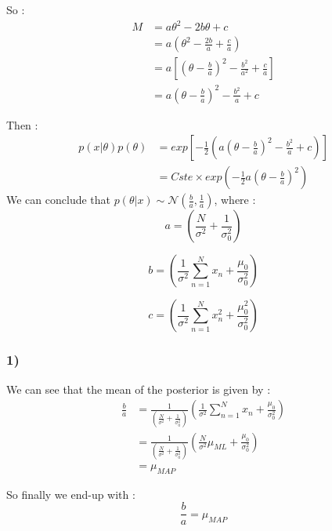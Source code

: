 \documentclass[12pt,twoside]{article}
\begin{document}
So :
\begin{align*}
M &= a \theta^2 - 2b \theta + c \\
  &= a \left(\theta^2 - \frac{2b}{a} + \frac{c}{a}\right) \\
  &= a \left[\left( \theta - \frac{b}{a} \right)^2 - \frac{b^2}{a^2} + \frac{c}{a}\right] \\
  &= a \left( \theta - \frac{b}{a} \right)^2 - \frac{b^2}{a} + c
\end{align*}

Then :
\begin{align*}
p(x|\theta)p(\theta) &= exp \left[-\frac{1}{2}\left(a ( \theta - \frac{b}{a} )^2 - \frac{b^2}{a} + c\right)\right] \\
                     &= Cste \times exp \left(-\frac{1}{2}a( \theta - \frac{b}{a} )^2\right)
\end{align*}
We  can conclude that $p(\theta|x) \sim \mathcal{N}(\frac{b}{a}, \frac{1}{a})$, where :
\begin{equation*}
a = \left(\frac{N}{\sigma^2} + \frac{1}{\sigma_0^2}\right)
\end{equation*}

\begin{equation*}
b = \left(\frac{1}{\sigma^2}\sum_{n=1}^{N}x_n + \frac{\mu_0}{\sigma_0^2} \right)
\end{equation*}

\begin{equation*}
c = \left(\frac{1}{\sigma^2} \sum_{n=1}^{N}x_n^2 + \frac{\mu_0^2}{\sigma_0^2} \right)
\end{equation*}

\subsubsection*{1)} We can see that the mean of the posterior is given by :
\begin{align*}
\frac{b}{a} &= \frac{1}{\left(\frac{N}{\sigma^2} + \frac{1}{\sigma_0^2}\right)} \left(\frac{1}{\sigma^2}\sum_{n=1}^{N}x_n + \frac{\mu_0}{\sigma_0^2} \right) \\
            &= \frac{1}{\left(\frac{N}{\sigma^2} + \frac{1}{\sigma_0^2}\right)} \left(\frac{N}{\sigma^2}\mu_{ML} + \frac{\mu_0}{\sigma_0^2} \right) \\
            &= \mu_{MAP}
\end{align*}

So finally we end-up with :
\begin{equation}
\boxed{\frac{b}{a} = \mu_{MAP}}
\end{equation}
\end{document}
